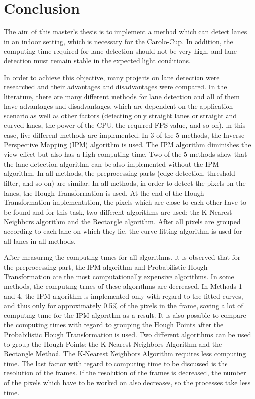 %
\chapter{Conclusion}\label{cha:Conclusion}
%

The aim of this master's thesis is to implement a method which can detect lanes in an indoor setting, which is necessary for the Carolo-Cup. In addition, the computing time required for lane detection should not be very high, and lane detection must remain stable in the expected light conditions.

In order to achieve this objective, many projects on lane detection were researched and their advantages and disadvantages were compared. In the literature, there are many different methods for lane detection and all of them have advantages and disadvantages, which are dependent on the application scenario as well as other factors (detecting only straight lanes or straight and curved lanes, the power of the CPU, the required FPS value, and so on). In this case, five different methods are implemented. In 3 of the 5 methods, the Inverse Perspective Mapping (IPM) algorithm is used. The IPM algorithm diminishes the view effect but also has a high computing time. Two of the 5 methods show that the lane detection algorithm can be also implemented without the IPM algorithm. In all methods, the preprocessing parts (edge detection, threshold filter, and so on) are similar. In all methods, in order to detect the pixels on the lanes, the Hough Transformation is used. At the end of the Hough Transformation implementation, the pixels which are close to each other have to be found and for this task, two different algorithms are used: the K-Nearest Neighbors algorithm and the Rectangle algorithm. After all pixels are grouped according to each lane on which they lie, the curve fitting algorithm is used for all lanes in all methods.

After measuring the computing times for all algorithms, it is observed that for the preprocessing part, the IPM algorithm and Probabilistic Hough Transformation are the most computationally expensive algorithms. In some methods, the computing times of these algorithms are decreased. In Methods 1 and 4, the IPM algorithm is implemented only with regard to the fitted curves, and thus only for approximately 0.5\% of the pixels in the frame, saving a lot of computing time for the IPM algorithm as a result. It is also possible to compare the computing times with regard to grouping the Hough Points after the Probabilistic Hough Transformation is used. Two different algorithms can be used to group the Hough Points: the K-Nearest Neighbors Algorithm and the Rectangle Method. The K-Nearest Neighbors Algorithm requires less computing time. The last factor with regard to computing time to be discussed is the resolution of the frames. If the resolution of the frames is decreased, the number of the pixels which have to be worked on also decreases, so the processes take less time.

